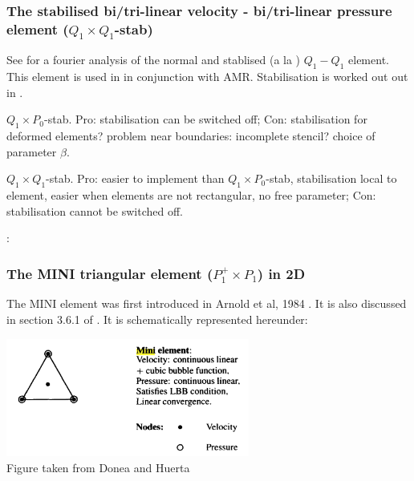 \subsubsection{The stabilised bi/tri-linear velocity -  bi/tri-linear pressure element ($Q_1\times Q_1$-stab)}

\begin{minipage}[t]{0.5\textwidth}

\end{minipage}
\begin{minipage}[t]{0.5\textwidth}

\end{minipage}

See \cite{nosi01} for a fourier analysis of the normal and stablised (a la \cite{hufb86}) $Q_1-Q_1$ element.
This element is used in \cite{bugs09,busa13} in conjunction with AMR. 
Stabilisation is worked out out in \cite{dobo04,bodg06}.

$Q_1\times P_0$-stab. Pro: stabilisation can be switched off; Con: stabilisation for deformed elements? 
problem near boundaries: incomplete stencil? choice of parameter $\beta$.

$Q_1\times Q_1$-stab. Pro: easier to implement than $Q_1\times P_0$-stab, stabilisation local to element, easier when elements are not rectangular, no free parameter; Con: stabilisation cannot be switched off.

\Literature: \cite{shry78,temr92,tezd92,grcc95,knto00,fros07}


\subsubsection{The MINI triangular element ($P_1^+\times P_1$) in 2D}
\label{pair:mini}

The  MINI element was first introduced in Arnold et al, 1984 \cite{arbf84}.
It is also discussed in section 3.6.1 of \cite{john16}.
It is schematically represented hereunder:

\begin{center}
\includegraphics[width=8cm]{images/mini/minielement}\\
{\captionfont Figure taken from Donea and Huerta \cite{dohu03}}
\end{center}

